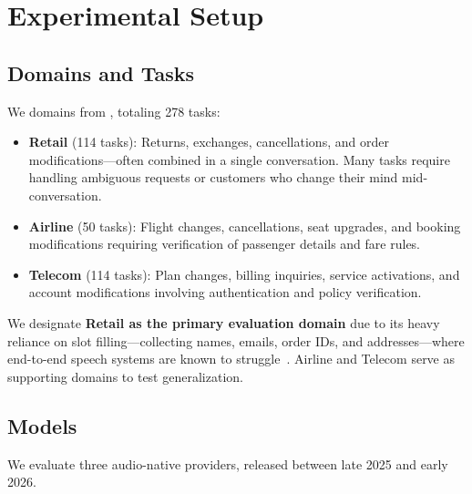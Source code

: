 \section{Experimental Setup}
\label{sec:experiments}

\subsection{Domains and Tasks}

We   domains from \tautwobench{}, totaling 278 tasks:
\begin{itemize}[nosep,leftmargin=*]
    \item \textbf{Retail} (114 tasks): Returns, exchanges, cancellations, and order modifications---often combined in a single conversation. Many tasks require handling ambiguous requests or customers who change their mind mid-conversation.
    \item \textbf{Airline} (50 tasks): Flight changes, cancellations, seat upgrades, and booking modifications requiring verification of passenger details and fare rules.
    \item \textbf{Telecom} (114 tasks): Plan changes, billing inquiries, service activations, and account modifications involving authentication and policy verification.
\end{itemize}
We designate \textbf{Retail as the primary evaluation domain} due to its heavy reliance on slot filling---collecting names, emails, order IDs, and addresses---where end-to-end speech systems are known to struggle~\citep{li_cb-whisper_2024, si_spokenwoz_2025}. Airline and Telecom serve as supporting domains to test generalization.

\subsection{Models}

We evaluate three audio-native providers, released between late 2025 and early 2026.  

